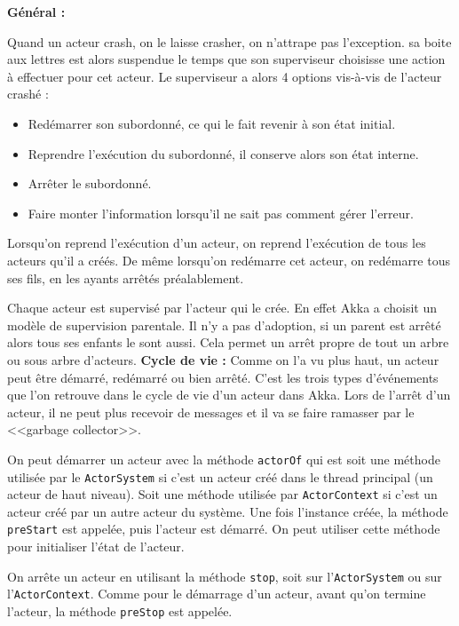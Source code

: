 \documentclass[11pt, a4paper]{article}
\begin{document}
\newline
\textbf{Général :}
\par Quand un acteur crash, on le laisse crasher, on n'attrape pas l'exception. sa boite aux lettres est alors suspendue le temps que son superviseur choisisse une action à effectuer pour cet acteur. Le superviseur a alors 4 options vis-à-vis de l'acteur crashé :
\begin{itemize}
\item Redémarrer son subordonné, ce qui le fait revenir à son état initial.
\item Reprendre l’exécution du subordonné, il conserve alors son état interne.
\item Arrêter le subordonné.
\item Faire monter l'information lorsqu'il ne sait pas comment gérer l'erreur.
\end{itemize}
Lorsqu'on reprend l’exécution d'un acteur, on reprend l'exécution de tous les acteurs qu'il a créés. De même lorsqu'on redémarre cet acteur, on redémarre tous ses fils, en les ayants arrêtés préalablement.
\par Chaque acteur est supervisé par l'acteur qui le crée. En effet Akka a choisit un modèle de supervision parentale. Il n'y a pas d'adoption, si un parent est arrêté alors tous ses enfants le sont aussi. Cela permet un arrêt propre de tout un arbre ou sous arbre d'acteurs.
\newline
\newline
\textbf{Cycle de vie :}
Comme on l'a vu plus haut, un acteur peut être démarré, redémarré ou bien arrêté. C'est les trois types d’événements que l'on retrouve dans le cycle de vie d'un acteur dans Akka. Lors de l'arrêt d'un acteur, il ne peut plus recevoir de messages et il va se faire ramasser par le <<garbage collector>>.

\par On peut démarrer un acteur avec la méthode \verb!actorOf! qui est soit une méthode utilisée par le \verb!ActorSystem! si c'est un acteur créé dans le thread principal (un acteur de haut niveau). Soit une méthode utilisée par \verb!ActorContext! si c'est un acteur créé par un autre acteur du système. Une fois l'instance créée, la méthode \verb!preStart! est appelée, puis l'acteur est démarré. On peut utiliser cette méthode pour initialiser l'état de l'acteur.

\par On arrête un acteur en utilisant la méthode \verb!stop!, soit sur l'\verb!ActorSystem! ou sur l'\verb!ActorContext!. Comme pour le démarrage d'un acteur, avant qu'on termine l'acteur, la méthode \verb!preStop! est appelée. 	 
\end{document}
